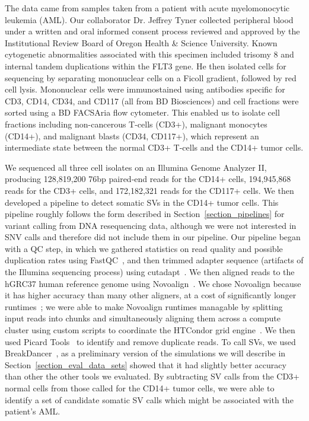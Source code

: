 The data came from samples taken from a patient with acute myelomonocytic leukemia (AML). Our collaborator Dr. Jeffrey Tyner collected peripheral blood under a written and oral informed consent process reviewed and approved by the Institutional Review Board of Oregon Health \& Science University. Known cytogenetic abnormalities associated with this specimen included trisomy 8 and internal tandem duplications within the FLT3 gene. He then isolated cells for sequencing by separating mononuclear cells on a Ficoll gradient, followed by red cell lysis. Mononuclear cells were immunostained using antibodies specific for CD3, CD14, CD34, and CD117 (all from BD Biosciences) and cell fractions were sorted using a BD FACSAria flow cytometer. This enabled us to isolate cell fractions including non-cancerous T-cells (CD3+), malignant monocytes (CD14+), and malignant blasts (CD34, CD117+), which represent an intermediate state between the normal CD3+ T-cells and the CD14+ tumor cells. 

We sequenced all three cell isolates on an Illumina Genome Analyzer II, producing 128,819,200 76bp paired-end reads for the CD14+ cells, 194,945,868 reads for the CD3+ cells, and 172,182,321 reads for the CD117+ cells. We then developed a pipeline to detect somatic SVs in the CD14+ tumor cells. This pipeline roughly follows the form described in Section~\ref{section_pipelines} for variant calling from DNA resequencing data, although we were not interested in SNV calls and therefore did not include them in our pipeline. Our pipeline began with a QC step, in which we gathered statistics on read quality and possible duplication rates using FastQC~\cite{fastqc}, and then trimmed adapter sequence (artifacts of the Illumina sequencing process) using cutadapt~\cite{Martin2011Cutadapt}. We then aligned reads to the hGRC37 human reference genome using Novoalign~\cite{novoalign}. We chose Novoalign because it has higher accuracy than many other aligners, at a cost of significantly longer runtimes~\cite{Ruffalo:2011p1758}; we were able to make Novoalign runtimes managable by splitting input reads into chunks and simultaneously aligning them across a compute cluster using custom scripts to coordinate the HTCondor grid engine~\cite{condor-practice}. We then used Picard Tools~\cite{picard} to identify and remove duplicate reads. To call SVs, we used BreakDancer~\cite{Chen:2009p3}, as a preliminary version of the simulations we will describe in Section~\ref{section_eval_data_sets} showed that it had slightly better accuracy than other the other tools we evaluated. By subtracting SV calls from the CD3+ normal cells from those called for the CD14+ tumor cells, we were able to identify a set of candidate somatic SV calls which might be associated with the patient's AML.

